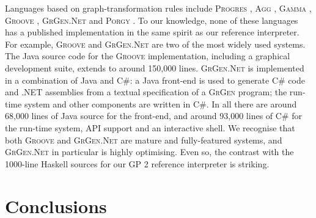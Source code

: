 Languages based on graph-transformation rules include
\textsc{Progres} \cite{Schuerr-Winter-Zuendorf99a},
\textsc{Agg} \cite{Ermel-Rudolf-Taentzer99a,Runge-Ermel-Taentzer11a},
\textsc{Gamma} \cite{Fradet-LeMetayer98a},
\textsc{Groove} \cite{Ghamarian-deMol-Rensink-Zambon-Zimakova12a},
\textsc{GrGen.Net} \cite{Jakumeit-Buchwald-Kroll10a} and
\textsc{Porgy} \cite{Fernandez-Kirchner-Mackie-Pinaud14a}.
To our knowledge, none of these languages has a published implementation in the same spirit as our reference interpreter. For example, \textsc{Groove} and \textsc{GrGen.Net} are two of the most widely used systems. The Java source code for the \textsc{Groove} implementation, including a graphical development suite, extends to around 150,000 lines. \textsc{GrGen.Net} is implemented in a combination of Java and C\#: a Java front-end is used to generate C\# code and .NET assemblies from a textual specification of a \textsc{GrGen} program; the run-time system and other components are written in C\#. In all there are around 68,000 lines of Java source for the front-end, and around 93,000 lines of C\# for the run-time system, API support and an interactive shell.
We recognise that both \textsc{Groove} and \textsc{GrGen.Net} are mature and fully-featured systems, and \textsc{GrGen.Net} in particular is highly optimising. Even so, the contrast with the 1000-line Haskell sources for our GP 2 reference interpreter is striking.

\section{Conclusions}
\label{sec:conclusions}






